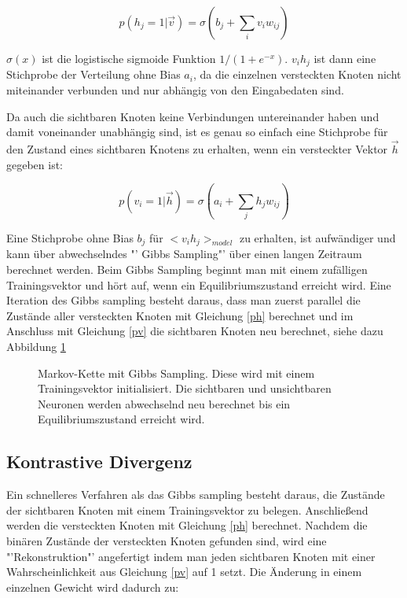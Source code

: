 \documentclass[12pt]{article}
\begin{document}
\begin{equation}
p(h_j = 1 | \vec{v}) = \sigma (b_j + \sum_{i} v_i w_{ij})
\label{ph}
\end{equation}

$\sigma(x)$ ist die logistische sigmoide Funktion $1/(1+e^{-x})$. $v_ih_j$ ist dann eine Stichprobe der Verteilung ohne Bias $a_i$, da die einzelnen versteckten Knoten nicht miteinander verbunden und nur abhängig von den Eingabedaten sind.

Da auch die sichtbaren Knoten keine Verbindungen untereinander haben und damit voneinander unabhängig sind, ist es genau so einfach eine Stichprobe für den Zustand eines sichtbaren Knotens zu erhalten, wenn ein versteckter Vektor $\vec{h}$ gegeben ist:

\begin{equation}
p(v_i =1 | \vec{h}) = \sigma (a_i + \sum_{j} h_j w_{ij})
\label{pv}
\end{equation}

Eine Stichprobe ohne Bias $b_j$ für $<v_i h_j>_{model}$ zu erhalten, ist aufwändiger und kann über abwechselndes "' Gibbs Sampling"' über einen langen Zeitraum berechnet werden. Beim Gibbs Sampling beginnt man mit einem zufälligen Trainingsvektor und hört auf, wenn ein Equilibriumszustand erreicht wird. Eine Iteration des Gibbs sampling besteht daraus, dass man zuerst parallel die Zustände aller versteckten Knoten mit Gleichung \ref{ph} berechnet und im Anschluss mit Gleichung \ref{pv} die sichtbaren Knoten neu berechnet, siehe dazu Abbildung \ref{Markov}

\begin{figure}[H]
	\center
	
	\caption{Markov-Kette mit Gibbs Sampling. Diese wird mit einem Trainingsvektor initialisiert. Die sichtbaren und unsichtbaren Neuronen werden abwechselnd neu berechnet bis ein Equilibriumszustand erreicht wird.}
	\label{Markov}
	\end{figure}


\subsection{Kontrastive Divergenz}

Ein schnelleres Verfahren als das Gibbs sampling besteht daraus, die Zustände der sichtbaren Knoten mit einem Trainingsvektor zu belegen. Anschließend werden die versteckten Knoten mit Gleichung \ref{ph} berechnet. Nachdem die binären Zustände der versteckten Knoten gefunden sind, wird eine "'Rekonstruktion"' angefertigt indem man jeden sichtbaren Knoten mit einer Wahrscheinlichkeit aus Gleichung \ref{pv} auf 1 setzt. Die Änderung in einem einzelnen Gewicht wird dadurch zu:
\end{document}

